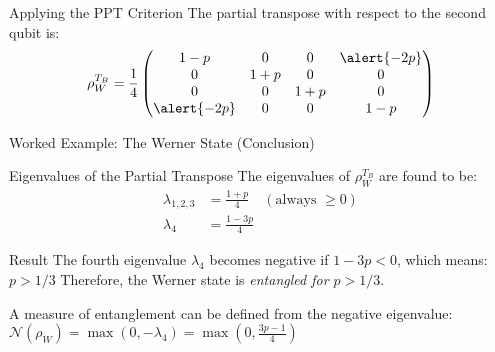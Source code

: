 \begin{frame}
  \begin{block}{Applying the PPT Criterion}
    The partial transpose with respect to the second qubit is:
    \[
      \rho_W^{T_B} = \frac{1}{4}
      \begin{pmatrix}
        1-p & 0 & 0 & \alert{-2p} \\
        0 & 1+p & 0 & 0 \\
        0 & 0 & 1+p & 0 \\
        \alert{-2p} & 0 & 0 & 1-p
      \end{pmatrix}
    \]
  \end{block}
\end{frame}


\begin{frame}{Worked Example: The Werner State (Conclusion)}
  \begin{block}{Eigenvalues of the Partial Transpose}
    The eigenvalues of $\rho_W^{T_B}$ are found to be:
    \begin{align*}
      \lambda_{1,2,3} &= \frac{1+p}{4} \quad (\text{always } \ge 0) \\
      \lambda_4 &= \frac{1-3p}{4}
    \end{align*}
  \end{block}
  \vspace{-2em}
  \pause
  \begin{alertblock}{Result}
    The fourth eigenvalue $\lambda_4$ becomes negative if $1-3p < 0$, which means:
    \( p > 1/3 \)
    Therefore, the Werner state is \emph{entangled for $p > 1/3$}.
    \pause

    A measure of entanglement can be defined from the negative eigenvalue:
    \(
    \mathcal{N}(\rho_W) = \max\left(0, -\lambda_4\right) = \max\left(0,
    \frac{3p-1}{4}\right)
    \)
  \end{alertblock}
\end{frame}


